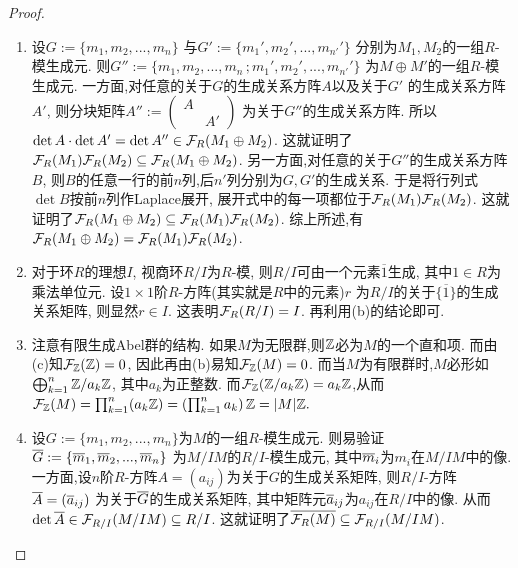 \documentclass[oneside,a4papar,11pt,UTF8]{book}
\begin{document}
\begin{enumerate}[resume]
\begin{proof}
\begin{enumerate}
      \item 设$G:=\{m_1,m_2,...,m_n\}$
      与$G':=\{m_{1}',m_2',...,m_{n'}'\}$
      分别为$M_1,M_2$的一组$R$-模生成元.
      则$G'':=\{m_1,m_2,...,m_n\,;m_{1}',m_2',...,m_{n'}'\}$
      为$M\oplus M'$的一组$R$-模生成元.
      一方面,对任意的关于$G$的生成关系方阵$A$以及关于$G'$
      的生成关系方阵$A'$,
      则分块矩阵$ A'':=
      \begin{pmatrix}
        A &  \\
          & A'
      \end{pmatrix}$
      为关于$G''$的生成关系方阵.
      所以$\det A\cdot\det A'=\det A''\in\mathcal{F}_R(M_1\oplus M_2)$.
      这就证明了$\mathcal{F}_R(M_1)\mathcal{F}_R(M_2)
      \subseteq\mathcal{F}_R(M_1\oplus M_2)$.
      另一方面,对任意的关于$G''$的生成关系方阵$B$,
      则$B$的任意一行的前$n$列,后$n'$列分别为$G,G'$的生成关系.
      于是将行列式$\det B$按前$n$列作Laplace展开,
      展开式中的每一项都位于$\mathcal{F}_R(M_1)\mathcal{F}_R(M_2)$.
      这就证明了$\mathcal{F}_R(M_1\oplus M_2)
      \subseteq\mathcal{F}_R(M_1)\mathcal{F}_R(M_2)$.
      综上所述,有$\mathcal{F}_R(M_1\oplus M_2)
      =\mathcal{F}_R(M_1)\mathcal{F}_R(M_2)$.

      \item 对于环$R$的理想$I$,
      视商环$R/I$为$R$-模,
      则$R/I$可由一个元素$\overline{1}$生成,
      其中$1\in R$为乘法单位元.
      设$1\times 1$阶$R$-方阵(其实就是$R$中的元素)$r$
      为$R/I$的关于$\{\overline{1}\}$的生成关系矩阵,
      则显然$r\in I$.
      这表明$\mathcal{F}_R(R/I)=I$.
      再利用(b)的结论即可.

      \item 注意有限生成Abel群的结构.
      如果$M$为无限群,则$\mathbb{Z}$必为$M$的一个直和项.
      而由(c)知$\mathcal{F}_{\mathbb{Z}}(\mathbb{Z})=0$,
      因此再由(b)易知$\mathcal{F}_{\mathbb{Z}}(M)=0$.
      而当$M$为有限群时,$M$必形如
      $\bigoplus_{k=1}^n\mathbb{Z}/a_k\mathbb{Z}$,
      其中$a_k$为正整数.
      而$\mathcal{F}_{\mathbb{Z}}(\mathbb{Z}/a_k\mathbb{Z})=a_k\mathbb{Z}$,从而
      $
        \mathcal{F}_{\mathbb{Z}}(M)
      =\prod_{k=1}^{n}
        (a_k\mathbb{Z})
      =\left(
        \prod_{k=1}^{n}
          a_k
       \right)\mathbb{Z}
      =|M|\mathbb{Z}.
      $
      \item 设$G:=\{m_1,m_2,...,m_n\}$为$M$的一组$R$-模生成元.
      则易验证$\overline{G}:=\{\overline{m}_1,\overline{m}_2,...,\overline{m}_n\}$
      为$M/IM$的$R/I$-模生成元,
      其中$\overline{m}_i$为$m_i$在$M/IM$中的像.
      一方面,设$n$阶$R$-方阵$A=(a_{ij})$为关于$G$的生成关系矩阵,
      则$R/I$-方阵$\overline{A}=(\overline{a}_{ij})$
      为关于$\overline{G}$的生成关系矩阵,
      其中矩阵元$\overline{a}_{ij}$为$a_{ij}$在$R/I$中的像.
      从而$\det\overline{A}\in\mathcal{F}_{R/I}(M/IM)\subseteq R/I$.
      这就证明了$\overline{\mathcal{F}_R(M)}\subseteq\mathcal{F}_{R/I}(M/IM)$.


\end{enumerate}
\end{proof}
\end{enumerate}
\end{document}
